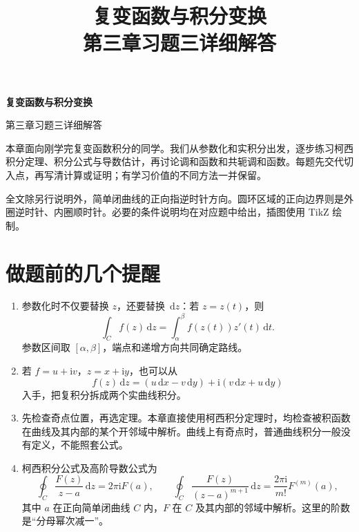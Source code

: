 \documentclass[UTF8,11pt,a4paper,fontset=fandol]{ctexart}
\title{复变函数与积分变换\\第三章习题三详细解答}
\author{}
\date{}
\newcommand{\ii}{\mathrm{i}}
\newcommand{\dd}{\,\mathrm{d}}
\begin{document}
\begin{center}
{\Large\bfseries 复变函数与积分变换\par}
\vspace{0.5em}
{\Large 第三章习题三详细解答\par}
\end{center}
\medskip
本章面向刚学完复变函数积分的同学。我们从参数化和实积分出发，逐步练习柯西积分定理、积分公式与导数估计，再讨论调和函数和共轭调和函数。每题先交代切入点，再写清计算或证明；有学习价值的不同方法一并保留。

全文除另行说明外，简单闭曲线的正向指逆时针方向。圆环区域的正向边界则是外圈逆时针、内圈顺时针。必要的条件说明均在对应题中给出，插图使用 TikZ 绘制。

{\setlength{\parskip}{0pt}\tableofcontents}
\newpage
\section*{做题前的几个提醒}
\begin{enumerate}
\item 参数化时不仅要替换 $z$，还要替换 $\dd z$：若 $z=z(t)$，则
\[
\int_C f(z)\dd z=\int_\alpha^\beta f(z(t))z'(t)\dd t.
\]
参数区间取 $[\alpha,\beta]$，端点和递增方向共同确定路线。
\item 若 $f=u+\ii v$，$z=x+\ii y$，也可以从
\[
f(z)\dd z=(u\dd x-v\dd y)+\ii(v\dd x+u\dd y)
\]
入手，把复积分拆成两个实曲线积分。
\item 先检查奇点位置，再选定理。本章直接使用柯西积分定理时，均检查被积函数在曲线及其内部的某个开邻域中解析。曲线上有奇点时，普通曲线积分一般没有定义，不能照套公式。
\item 柯西积分公式及高阶导数公式为
\[
\oint_C\frac{F(z)}{z-a}\dd z=2\pi\ii F(a),\qquad
\oint_C\frac{F(z)}{(z-a)^{m+1}}\dd z
=\frac{2\pi\ii}{m!}F^{(m)}(a),
\]
其中 $a$ 在正向简单闭曲线 $C$ 内，$F$ 在 $C$ 及其内部的邻域中解析。这里的阶数是“分母幂次减一”。
\end{enumerate}
\end{document}
